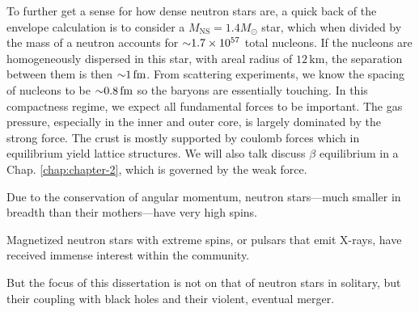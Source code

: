 To further get a sense for how dense neutron stars are, a quick back of the envelope calculation is to consider a $M_\textrm{NS} = 1.4 M _\odot$ star, which when divided by the mass of a neutron accounts for $\mathord{\sim} 1.7 \times 10^{57}$ total nucleons.
If the nucleons are homogeneously dispersed in this star, with areal radius of $12\,\textrm{km}$, the separation between them is then $\mathord{\sim} 1\,\textrm{fm}$.
From scattering experiments, we know the spacing of nucleons to be $\mathord{\sim} 0.8\,\textrm{fm}$ so the baryons are essentially touching.
In this compactness regime, we expect all fundamental forces to be important.
The gas pressure, especially in the inner and outer core, is largely dominated by the strong force.  
The crust is mostly supported by coulomb forces which in equilibrium yield lattice structures.
We will also talk discuss $\beta$ equilibrium in a Chap. \ref{chap:chapter-2}, which is governed by the weak force.

Due to the conservation of angular momentum, neutron stars---much smaller in breadth than their mothers---have very high spins.

Magnetized neutron stars with extreme spins, or pulsars that emit X-rays,
 have received immense interest within the community.

But the focus of this dissertation is not on that of neutron stars in solitary,
 but their coupling with black holes and their violent, eventual merger.

